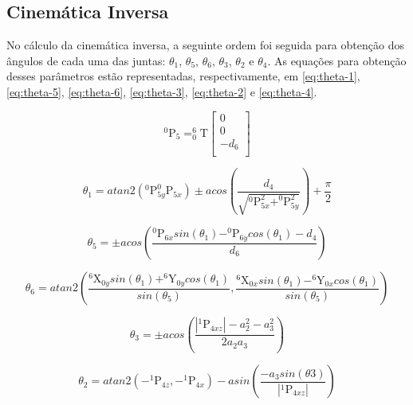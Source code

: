 \subsection{Cinemática Inversa}
\label{ssec:cinematica-inversa}

No cálculo da cinemática inversa, a seguinte ordem foi seguida para obtenção dos ângulos de cada uma das juntas: $\theta_{1}$, $\theta_{5}$, $\theta_{6}$, $\theta_{3}$, $\theta_{2}$ e $\theta_{4}$. As equações para obtenção desses parâmetros estão representadas, respectivamente, em \ref{eq:theta-1}, \ref{eq:theta-5}, \ref{eq:theta-6}, \ref{eq:theta-3}, \ref{eq:theta-2} e \ref{eq:theta-4}.

\begin{equation}\label{eq:translacao-frame-5}
^{0}\textrm{P}_{5} = _{0}^{6}\textrm{T}
	\begin{bmatrix}
		0 \\ 
		0 \\ 
		-d_{6}\\ 
	\end{bmatrix}
\end{equation}

\begin{equation}\label{eq:theta-1}
\theta _1=atan2\left (^{0}\textrm{P}_{5y}^{0}\textrm{P}_{5x}  \right )\pm acos\left ( \frac{d_4}{\sqrt{^{0}\textrm{P}_{5x}^{2}+^{0}\textrm{P}_{5y}^{2}}} \right )+\frac{\pi }{2}
\end{equation}

\begin{equation}\label{eq:theta-5}
\theta _5=\pm acos\left ( \frac{^{0}\textrm{P}_{6x}sin(\theta _1)-^{0}\textrm{P}_{6y}cos(\theta _1)-d_4}{d_6} \right )
\end{equation}

\begin{equation}\label{eq:theta-6}
\theta _6=atan2\left ( \frac{^{6}\textrm{X}_{0y}sin(\theta_1)+^{6}\textrm{Y}_{0y}cos(\theta_1)}{sin(\theta_5)}, \frac{^{6}\textrm{X}_{0x}sin(\theta_1)-^{6}\textrm{Y}_{0x}cos(\theta_1)}{sin(\theta_5)} \right )
\end{equation}

\begin{equation}\label{eq:theta-3}
\theta _3 = \pm acos\left ( \frac{\left |^{1}\textrm{P}_{4xz}  \right |-a_2^2-a_3^2}{2a_2a_3} \right )
\end{equation}

\begin{equation}\label{eq:theta-2}
\theta _2 = atan2\left (-^{1}\textrm{P}_{4z},-^{1}\textrm{P}_{4x}  \right )-asin\left ( \frac{-a_3sin(\theta3)}{\left |^{1}\textrm{P}_{4xz}  \right |} \right )
\end{equation}

